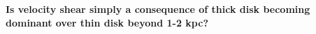 \documentclass[letterpaper,landscape]{slides}
\begin{document}




 

\begin{slide}

{\bf Is velocity shear simply a consequence of thick disk 
becoming dominant over thin disk beyond 1-2 kpc?}




\vfill 
\end{slide}
\end{document}
